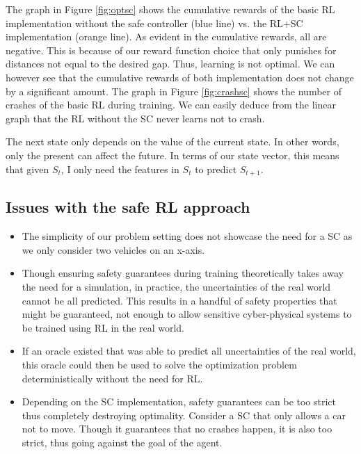 The graph in Figure \ref{fig:optsc} shows the cumulative rewards of the basic RL implementation without
the safe controller (blue line) vs. the RL+SC implementation (orange line). As evident in the cumulative rewards, all are negative. This is because of our reward function choice 
that only punishes for distances not equal to the desired gap. Thus, learning is not optimal. We can however see that the cumulative rewards of both implementation does not change by a significant 
amount. The graph in Figure \ref{fig:crashsc} shows 
the number of crashes of the basic RL during training. We can easily deduce from the linear graph that the RL without the SC never learns not to crash.


\begin{definition}
  The next state only depends on the value of the current state. In other words, only the present can affect the future. 
  In terms of our state vector, this means that given $S_t$, I only need the features in $S_t$ to predict $S_{t+1}$.
\end{definition}

\subsection{Issues with the safe RL approach}
\begin{itemize}
  \item The simplicity of our problem setting does not showcase the need for a SC as we only consider two vehicles on an x-axis. 
  \item Though ensuring safety guarantees during training theoretically takes away the need for a simulation, in practice, the uncertainties 
        of the real world cannot be all predicted. This results in a handful of safety properties that might be guaranteed, not enough to allow sensitive cyber-physical systems 
        to be trained using RL in the real world. 
  \item If an oracle existed that was able to predict all uncertainties of the real world, this oracle could then be used to solve the optimization problem 
        deterministically without the need for RL. 
  \item Depending on the SC implementation, safety guarantees can be too strict thus completely destroying optimality. Consider a SC that only allows a car not to move. 
        Though it guarantees that no crashes happen, it is also too strict, thus going against the goal of the agent. 
  
\end{itemize}

